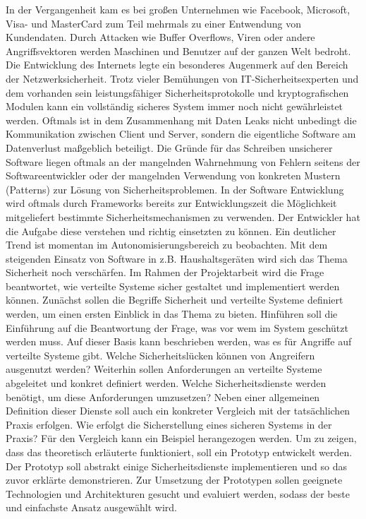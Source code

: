 \documentclass[utf8,biblatex]{lni}
\begin{document}
In der Vergangenheit kam es bei großen Unternehmen wie Facebook, Microsoft, Visa- und
MasterCard zum Teil mehrmals zu einer Entwendung von Kundendaten. Durch Attacken wie
Buffer Overflows, Viren oder andere Angriffsvektoren werden Maschinen und Benutzer auf
der ganzen Welt bedroht. Die Entwicklung des Internets legte ein besonderes Augenmerk auf
den Bereich der Netzwerksicherheit. Trotz vieler Bemühungen von IT-Sicherheitsexperten
und dem vorhanden sein leistungsfähiger Sicherheitsprotokolle und kryptografischen
Modulen kann ein vollständig sicheres System immer noch nicht gewährleistet werden.
Oftmals ist in dem Zusammenhang mit Daten Leaks nicht unbedingt die Kommunikation
zwischen Client und Server, sondern die eigentliche Software am Datenverlust maßgeblich
beteiligt. Die Gründe für das Schreiben unsicherer Software liegen oftmals an der mangelnden
Wahrnehmung von Fehlern seitens der Softwareentwickler oder der mangelnden
Verwendung von konkreten Mustern (Patterns) zur Lösung von Sicherheitsproblemen. In der
Software Entwicklung wird oftmals durch Frameworks bereits zur Entwicklungszeit die
Möglichkeit mitgeliefert bestimmte Sicherheitsmechanismen zu verwenden. Der Entwickler
hat die Aufgabe diese verstehen und richtig einsetzten zu können. Ein deutlicher Trend ist
momentan im Autonomisierungsbereich zu beobachten. Mit dem steigenden Einsatz von
Software in z.B. Haushaltsgeräten wird sich das Thema Sicherheit noch verschärfen. 
\newline
Im Rahmen der Projektarbeit wird die Frage beantwortet, wie
verteilte Systeme sicher gestaltet und implementiert werden können. 
Zunächst sollen die Begriffe Sicherheit und verteilte Systeme definiert werden, 
um einen ersten Einblick in das Thema zu bieten. 
Hinführen soll die Einführung auf die Beantwortung der Frage, 
was vor wem im System geschützt werden muss. Auf dieser Basis kann beschrieben werden, 
was es für Angriffe auf verteilte Systeme gibt. 
Welche Sicherheitslücken können von Angreifern ausgenutzt werden? 
Weiterhin sollen Anforderungen an verteilte Systeme abgeleitet und konkret definiert werden. 
Welche Sicherheitsdienste werden benötigt, um diese Anforderungen umzusetzen? 
Neben einer allgemeinen Definition dieser Dienste soll auch ein konkreter Vergleich mit der tatsächlichen Praxis erfolgen. 
Wie erfolgt die Sicherstellung eines sicheren Systems in der Praxis? 
Für den Vergleich kann ein Beispiel herangezogen werden. 
Um zu zeigen, dass das theoretisch erläuterte funktioniert, soll ein Prototyp entwickelt werden. 
Der Prototyp soll abstrakt einige Sicherheitsdienste implementieren und so das zuvor erklärte demonstrieren. 
Zur Umsetzung der Prototypen sollen geeignete Technologien und Architekturen gesucht und evaluiert werden, 
sodass der beste und einfachste Ansatz ausgewählt wird.
\end{document}
